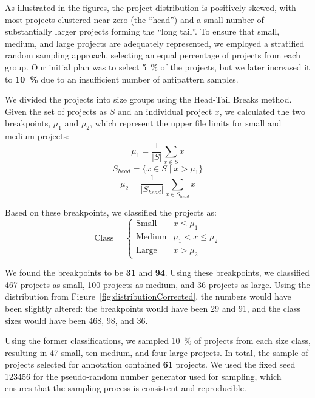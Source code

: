 As illustrated in the figures, the project distribution is positively skewed, with most projects clustered near zero (the “head”) and a small number of substantially larger projects forming the “long tail”. To ensure that small, medium, and large projects are adequately represented, we employed a stratified random sampling approach, selecting an equal percentage of projects from each group. Our initial plan was to select \qty{5}{\percent} of the projects, but we later increased it to \textbf{\qty{10}{\percent}} due to an insufficient number of antipattern samples.

We divided the projects into size groups using the Head-Tail Breaks method. Given the set of projects as \(S\) and an individual project \(x\), we calculated the two breakpoints, \(\mu_1\) and \(\mu_2\), which represent the upper file limits for small and medium projects:
\begin{equation}
\mu_1 = \frac{1}{|S|} \sum_{x \in S} x
\end{equation}
\begin{equation}
S_{head} = \{ x \in S \mid x > \mu_1 \}
\end{equation}
\begin{equation}
\mu_2 = \frac{1}{|S_{head}|} \sum_{x \in S_{head}} x
\end{equation}

Based on these breakpoints, we classified the projects as:
\begin{equation}
\text{Class} = \begin{cases}
      \text{Small} & x \le \mu_1 \\
      \text{Medium} & \mu_1 < x \le \mu_2 \\
      \text{Large} & x > \mu_2
   \end{cases}
\end{equation}

We found the breakpoints to be \textbf{\num{31}} and \textbf{\num{94}}. Using these breakpoints, we classified \num{467} projects as small, \num{100} projects as medium, and \num{36} projects as large. Using the distribution from Figure~\ref{fig:distributionCorrected}, the numbers would have been slightly altered: the breakpoints would have been \num{29} and \num{91}, and the class sizes would have been \num{468}, \num{98}, and \num{36}.

Using the former classifications, we sampled \qty{10}{\percent} of projects from each size class, resulting in \num{47} small, ten medium, and four large projects. In total, the sample of projects selected for annotation contained \textbf{61} projects. We used the fixed seed \num{123456} for the pseudo-random number generator used for sampling, which ensures that the sampling process is consistent and reproducible.

